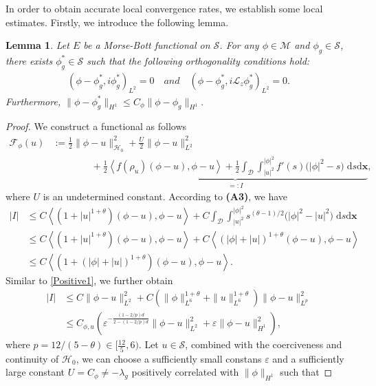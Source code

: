 \documentclass[preprint,3p]{elsarticle}
\newtheorem{lemma}{Lemma}[section]
\begin{document}
In order to obtain accurate local convergence rates, we establish some local estimates. Firstly, we introduce the following lemma.
\begin{lemma}\label{Transfer}
	Let $E$ be a
	Morse-Bott functional on $\mathcal{S}$. For any $\phi \in \mathcal{M}$ and $\phi_g\in\mathcal{S}$, there exists $\phi^*_g \in \mathcal{S}$ such that the following orthogonality conditions hold:
	{\rm
		\begin{align*}
			(\phi-\phi_g^*,i\phi_g^*)_{L^2}=0\quad and\quad(\phi-\phi_g^*,i\mathcal{L}_z\phi_g^*)_{L^2}=0.
		\end{align*}
	}
	Furthermore, $\|\phi-\phi_g^*\|_{H^1}\le C_{\phi} \|\phi-\phi_g\|_{H^1}.$
\end{lemma}
\begin{proof}
	We construct a functional as follows
	\begin{align}\label{f-phi-u}
		\mathcal{F}_{\phi}(u)&:=\frac{1}{2}\|\phi-u\|^2_{\mathcal{H}_0}+\frac{U}{2}\|\phi-u\|^2_{L^2}\\
		\nonumber&\qquad\qquad+\underbrace{\frac{1}{2}\left\langle f(\rho_{u})(\phi-u),\phi-u\right\rangle+\frac{1}{2}\int_{\mathcal{D}}\int_{|u|^2}^{|\phi|^2}f'(s)\big(|\phi|^2-s\big)\;\text{d}s\text{d}\bm{x}}_{=:I},
	\end{align}
	where $U$ is an undetermined constant. According to {\bf (A3)}, we have
	\begin{align*}
		|I|&\le C\left\langle \left(1+|u|^{1+\theta}\right)(\phi-u),\phi-u\right\rangle+C\int_{\mathcal{D}}\int_{|u|^2}^{|\phi|^2}s^{(\theta-1)/2}\big(|\phi|^2-|u|^2\big)\;\text{d}s\text{d}\bm{x}\\
		&\le C\left\langle \left(1+|u|^{1+\theta}\right)(\phi-u),\phi-u\right\rangle+C\left\langle \left(|\phi|+|u|\right)^{1+\theta}(\phi-u),\phi-u\right\rangle\\
		&\le C\left\langle \left(1+\left(|\phi|+|u|\right)^{1+\theta}\right)(\phi-u),\phi-u\right\rangle.
	\end{align*}
	Similar to \eqref{Positive1}, we further obtain
	\begin{align*}
		|I|&\le C\|\phi-u\|^2_{L^2}+C\left(\|\phi\|^{1+\theta}_{L^6}+\|u\|^{1+\theta}_{L^6}\right)\|\phi-u\|^2_{L^{p}}\\
		&\le C_{\phi,u}\left(\varepsilon^{-\frac{(1-2/p)d}{2-(1-2/p)d}}\|\phi-u\|^{2}_{L^{2}}+\varepsilon\|\phi-u\|^{2}_{H^1}\right),
	\end{align*}
	where $p=12/(5-\theta)\in[\frac{12}{5},6)$.
	Let $u\in\mathcal{S}$, combined with the coerciveness and continuity of $\mathcal{H}_0$, we can choose a sufficiently small constans $\varepsilon$ and a sufficiently large constant $U=C_{\phi}\neq-\lambda_{g}$ positively correlated with $\|\phi\|_{H^1}$ such that

\end{proof}
\end{document}
